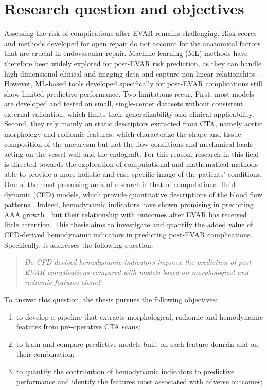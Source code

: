 \section{Research question and objectives}
Assessing the risk of complications after EVAR remains challenging. Risk scores and methods developed for open repair do not account for the anatomical factors that are crucial in endovascular repair. 
Machine learning (ML) methods have therefore been widely explored for post-EVAR risk prediction, as they can handle high-dimensional clinical and imaging data and capture non-linear relationships \cite{braak_scoping_2026, collins_tripodai_2024}.
However, ML-based tools developed specifically for post-EVAR complications still show limited predictive performance. Two limitations recur. First, most models are developed and tested on small, single-center datasets without consistent external validation, which limits their generalizability and clinical applicability\cite {lijftogt_systematic_2017}. Second, they rely mainly on static descriptors extracted from CTA, namely aortic morphology and radiomic features, which characterize the shape and tissue composition of the aneurysm but not the flow conditions and mechanical loads acting on the vessel wall and the endograft\cite{braak_scoping_2026, karthikesalingam_artificial_2015, long_applying_2024, li_machine_2023}. For this reason, research in this field is directed towards the exploration of computational and mathematical methods able to provide a more holistic and case-specific image of the patients' conditions. One of the most promising area of research is that of computational fluid dynamic (CFD) models, which provide quantitative descriptions of the blood flow patterns \cite{katsoudas_hemodynamic_2026, mutlu_how_2023}.  
Indeed, hemodynamic indicators have shown promising in predicting AAA growth  \cite{kim_deep_2023, rezaeitaleshmahalleh_characterization_2023, joly_cohort_2020, fedotova_association_2025}, but their relationship with outcomes after EVAR has received little attention. This thesis aims to investigate and quantify the added value of CFD-derived hemodynamic indicators in predicting post-EVAR complications. Specifically, it addresses the following question:
\begin{quote}
\emph{Do CFD-derived hemodynamic indicators improve the prediction of post-EVAR complications compared with models based on morphological and radiomic features alone?}
\end{quote}

To answer this question, the thesis pursues the following objectives:
\begin{enumerate}
    \item to develop a pipeline that extracts morphological, radiomic and hemodynamic features from pre-operative CTA scans; 
    \item to train and compare predictive models built on each feature domain and on their combination;
    \item to quantify the contribution of hemodynamic indicators to predictive performance and identify the features most associated with adverse outcomes;
\end{enumerate}

